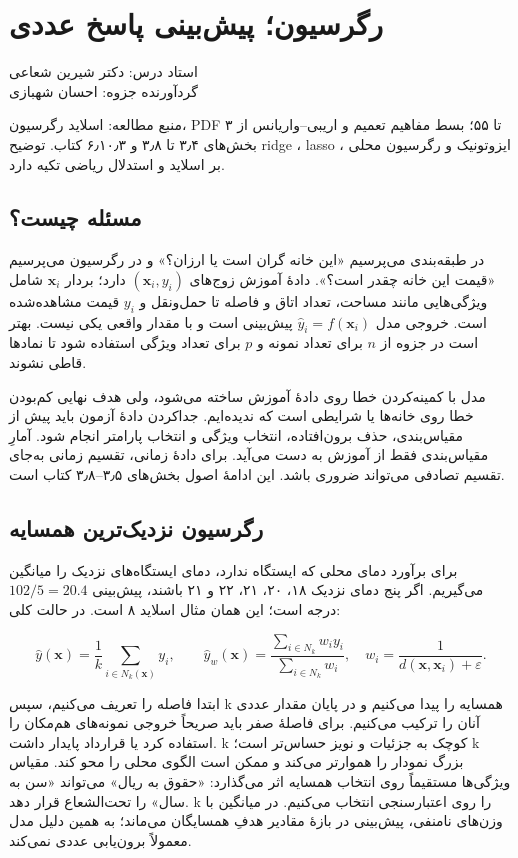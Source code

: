 \documentclass[12pt,a4paper,oneside]{report}
\newcommand{\source}[1]{\par{\small\color{muted} منبع مطالعه: #1}\par}
\begin{document}
\setcounter{chapter}{4}
\chapter{رگرسیون؛ پیش‌بینی پاسخ عددی}
\begin{center}{\small\color{muted} استاد درس: دکتر شیرین شعاعی\\[2mm] گردآورنده جزوه: احسان شهبازی}\end{center}

\source{اسلاید رگرسیون، PDF ۳ تا ۵۵؛ بسط مفاهیم تعمیم و اریبی–واریانس از بخش‌های ۳٫۴ تا ۳٫۸ و ۶٫۱۰٫۳ کتاب. توضیح ridge ، lasso ، ایزوتونیک و رگرسیون محلی بر اسلاید و استدلال ریاضی تکیه دارد.}
\section{مسئله چیست؟}

در طبقه‌بندی می‌پرسیم «این خانه گران است یا ارزان؟» و در رگرسیون می‌پرسیم «قیمت این خانه چقدر است؟». دادهٔ آموزش زوج‌های \((\boldsymbol{x}_i,y_i)\) دارد؛ بردار \(\boldsymbol{x}_i\) شامل ویژگی‌هایی مانند مساحت، تعداد اتاق و فاصله تا حمل‌ونقل و \(y_i\) قیمت مشاهده‌شده است. خروجی مدل \(\widehat y_i=f(\boldsymbol{x}_i)\) پیش‌بینی است و با مقدار واقعی یکی نیست. بهتر است در جزوه از \(n\) برای تعداد نمونه و \(p\) برای تعداد ویژگی استفاده شود تا نمادها قاطی نشوند.

مدل با کمینه‌کردن خطا روی دادهٔ آموزش ساخته می‌شود، ولی هدف نهایی کم‌بودن خطا روی خانه‌ها یا شرایطی است که ندیده‌ایم. جداکردن دادهٔ آزمون باید پیش از مقیاس‌بندی، حذف برون‌افتاده، انتخاب ویژگی و انتخاب پارامتر انجام شود. آمارِ مقیاس‌بندی فقط از آموزش به دست می‌آید. برای دادهٔ زمانی، تقسیم زمانی به‌جای تقسیم تصادفی می‌تواند ضروری باشد. این ادامهٔ اصول بخش‌های ۳٫۵--۳٫۸ کتاب است.

\section{رگرسیون نزدیک‌ترین همسایه}

برای برآورد دمای محلی که ایستگاه ندارد، دمای ایستگاه‌های نزدیک را میانگین می‌گیریم. اگر پنج دمای نزدیک ۱۸، ۲۰، ۲۱، ۲۲ و ۲۱ باشند، پیش‌بینی \(102/5=20.4\) درجه است؛ این همان مثال اسلاید ۸ است. در حالت کلی:

\[
\widehat y(\boldsymbol{x})=\frac1k\sum_{i\in N_k(\boldsymbol{x})}y_i,
\qquad
\widehat y_w(\boldsymbol{x})=\frac{\sum_{i\in N_k}w_i y_i}{\sum_{i\in N_k}w_i},
\quad w_i=\frac1{d(\boldsymbol{x},\boldsymbol{x}_i)+\varepsilon}.
\]

ابتدا فاصله را تعریف می‌کنیم، سپس k همسایه را پیدا می‌کنیم و در پایان مقدار عددی آنان را ترکیب می‌کنیم. برای فاصلهٔ صفر باید صریحاً خروجی نمونه‌های هم‌مکان را استفاده کرد یا قرارداد پایدار داشت. k کوچک به جزئیات و نویز حساس‌تر است؛ k بزرگ نمودار را هموارتر می‌کند و ممکن است الگوی محلی را محو کند. مقیاس ویژگی‌ها مستقیماً روی انتخاب همسایه اثر می‌گذارد: «حقوق به ریال» می‌تواند «سن به سال» را تحت‌الشعاع قرار دهد. k را روی اعتبارسنجی انتخاب می‌کنیم. در میانگین با وزن‌های نامنفی، پیش‌بینی در بازهٔ مقادیر هدفِ همسایگان می‌ماند؛ به همین دلیل مدل معمولاً برون‌یابی عددی نمی‌کند.
\end{document}
